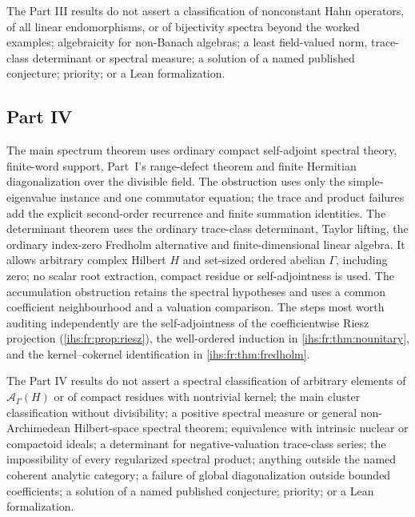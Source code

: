 \documentclass[11pt,a4paper]{article}
\numberwithin{equation}{section}
\theoremstyle{definition}
\theoremstyle{remark}
\newcommand{\Ahh}{\mathcal A_\Gamma(H)}
\begin{document}
The Part III results do not assert a classification of nonconstant Hahn
operators, of all linear endomorphisms, or of bijectivity spectra beyond the
worked examples; algebraicity for non-Banach algebras; a least field-valued
norm, trace-class determinant or spectral measure; a solution of a named
published conjecture; priority; or a Lean formalization.

\subsection{Part IV}\label{ihs:app:ledgerD}
The main spectrum theorem uses ordinary compact self-adjoint spectral
theory, finite-word support, Part~I's range-defect theorem and finite
Hermitian diagonalization over the divisible field. The obstruction uses
only the simple-eigenvalue instance and one commutator equation; the trace
and product failures add the explicit second-order recurrence and finite
summation identities. The determinant theorem uses the ordinary trace-class
determinant, Taylor lifting, the ordinary index-zero Fredholm alternative and
finite-dimensional linear algebra. It allows arbitrary complex Hilbert $H$
and set-sized ordered abelian $\Gamma$, including zero; no scalar root
extraction, compact residue or self-adjointness is used. The accumulation
obstruction retains the spectral hypotheses and uses a
common coefficient neighbourhood and a valuation comparison. The steps most
worth auditing independently are the self-adjointness of the coefficientwise
Riesz projection (\cref{ihs:fr:prop:riesz}), the well-ordered induction in
\cref{ihs:fr:thm:nounitary}, and the kernel--cokernel identification in
\cref{ihs:fr:thm:fredholm}.

The Part IV results do not assert a spectral classification of arbitrary
elements of $\Ahh$ or of compact residues with nontrivial kernel; the main
cluster classification without divisibility; a positive spectral measure or general
non-Archimedean Hilbert-space spectral theorem; equivalence with intrinsic
nuclear or compactoid ideals; a determinant for negative-valuation
trace-class series; the impossibility of every regularized spectral product;
anything outside the named coherent analytic category; a failure of global
diagonalization outside bounded coefficients; a solution of a named published
conjecture; priority; or a Lean formalization.
\end{document}
